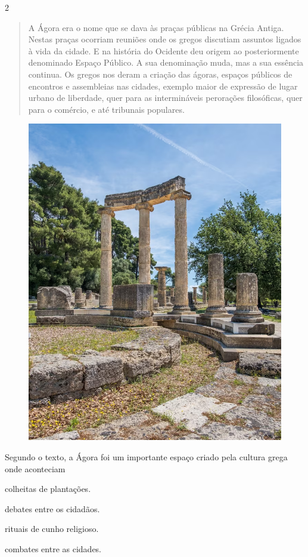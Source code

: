 \num{2}

\begin{quote}
A Ágora era o nome que se dava às praças públicas na Grécia Antiga.
Nestas praças ocorriam reuniões onde os gregos discutiam assuntos
ligados à vida da cidade. E na história do Ocidente deu origem ao
posteriormente denominado Espaço Público. A sua denominação muda, mas a
sua essência continua. Os gregos nos deram a criação das ágoras, espaços
públicos de encontros e assembleias nas cidades, exemplo maior de
expressão de lugar urbano de liberdade, quer para as intermináveis
perorações filosóficas, quer para o comércio, e até tribunais populares.
\end{quote}

\begin{figure}[htpb!]
\includegraphics[width=.5\textwidth]{./imgs/img43.png}
\caption{}
\end{figure}

Segundo o texto, a Ágora foi um importante espaço criado pela cultura
grega onde aconteciam

\begin{escolha}
\item colheitas de plantações.

\item debates entre os cidadãos.

\item rituais de cunho religioso.

\item combates entre as cidades.
\end{escolha}



